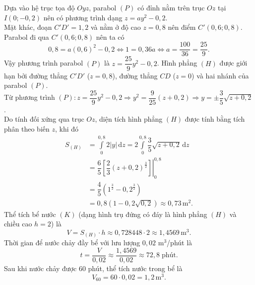 \begin{ex}
{\begin{center}
		\end{center}
		\begin{itemchoice}
			\itemch Dựa vào hệ trục tọa độ $Oyz$, parabol $(P)$ có đỉnh nằm trên trục $Oz$ tại $I(0;-0{,}2)$ nên có phương trình dạng $z=ay^2-0{,}2$. \\
			Mặt khác, đoạn $C'D'=1{,}2$ và nằm ở độ cao $z=0{,}8$ nên điểm $C'(0{,}6; 0{,}8)$. \\
			Parabol đi qua $C'(0{,}6; 0{,}8)$ nên ta có
			\[0{,}8 = a(0{,}6)^2 - 0{,}2 \Leftrightarrow 1 = 0{,}36a \Leftrightarrow a = \dfrac{100}{36} = \dfrac{25}{9}.\]
			Vậy phương trình parabol $(P)$ là $z=\dfrac{25}{9}y^2-0{,}2$.
			\itemch Hình phẳng $(H)$ được giới hạn bởi đường thẳng $C'D'$ ($z=0{,}8$), đường thẳng $CD$ ($z=0$) và hai nhánh của parabol $(P)$. \\
			Từ phương trình $(P)\colon z=\dfrac{25}{9}y^2-0{,}2\Rightarrow y^2=\dfrac{9}{25}(z+0{,}2)\Rightarrow y=\pm\dfrac{3}{5}\sqrt{z+0{,}2}$. \\
			Do tính đối xứng qua trục $Oz$, diện tích hình phẳng $(H)$ được tính bằng tích phân theo biến $z$, khi đó
			\allowdisplaybreaks
			\begin{align*}
				S_{(H)} &= \displaystyle\int\limits_{0}^{0{,}8} 2|y| \mathrm{\,d}z = 2 \displaystyle\int\limits_{0}^{0{,}8} \dfrac{3}{5}\sqrt{z+0{,}2} \mathrm{\,d}z \\
				&= \dfrac{6}{5} \left.\left[ \dfrac{2}{3} (z+0{,}2)^{\tfrac{3}{2}} \right]\right|_0^{0{,}8}\\
				& = \dfrac{4}{5} \left( 1^{\tfrac{3}{2}} - 0{,}2^{\tfrac{3}{2}} \right) \\
				&= 0{,}8 \left( 1 - 0{,}2\sqrt{0{,}2} \right) \approx 0{,}73\mathrm{\,m}^2.
			\end{align*}
			\itemch Thể tích bể nước $(K)$ (dạng hình trụ đứng có đáy là hình phẳng $(H)$ và chiều cao $h=2$) là
			\[V = S_{(H)} \cdot h \approx 0{,}728448 \cdot 2 \approx 1{,}4569 \mathrm{\,m}^3.\]
			Thời gian để nước chảy đầy bể với lưu lượng $0{,}02$ m$^3$/phút là
			\[t = \dfrac{V}{0{,}02} \approx \dfrac{1{,}4569}{0{,}02} \approx 72{,}8\;\text{phút}.\]
			\itemch Sau khi nước chảy được $60$ phút, thể tích nước trong bể là
			\[V_{60} = 60 \cdot 0{,}02 = 1{,}2 \mathrm{\,m}^3.\]

\end{itemchoice}}
\end{ex}

